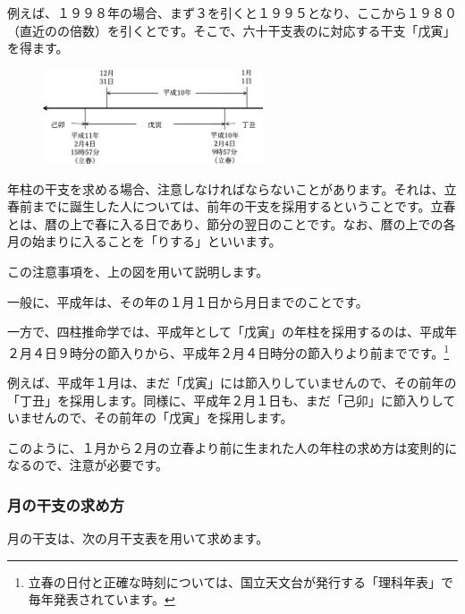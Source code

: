 \documentclass[a5paper,11pt,dvipdfmx]{tarticle}
\begin{document}
例えば、１９９８年の場合、まず３を引くと１９９５となり、ここから１９８０（直近のの倍数）を引くとです。そこで、六十干支表のに対応する干支「戊寅」を得ます。

\begin{figure}
  \includegraphics[width=65mm,angle=90]{figs/figure3-2.eps}
\end{figure}


年柱の干支を求める場合、注意しなければならないことがあります。それは、立春前までに誕生した人については、前年の干支を採用するということです。立春とは、暦の上で春に入る日であり、節分の翌日のことです。なお、暦の上での各月の始まりに入ることを「りする」といいます。

この注意事項を、上の図を用いて説明します。

一般に、平成年は、その年の１月１日から月日までのことです。

一方で、四柱推命学では、平成年として「戊寅」の年柱を採用するのは、平成年２月４日９時分の節入りから、平成年２月４日時分の節入りより前までです。\footnote{立春の日付と正確な時刻については、国立天文台が発行する「理科年表」で毎年発表されています。}

例えば、平成年１月は、まだ「戊寅」には節入りしていませんので、その前年の「丁丑」を採用します。同様に、平成年２月１日も、まだ「己卯」に節入りしていませんので、その前年の「戊寅」を採用します。

このように、１月から２月の立春より前に生まれた人の年柱の求め方は変則的になるので、注意が必要です。


\subsubsection*{月の干支の求め方}

月の干支は、次の月干支表を用いて求めます。
\end{document}
